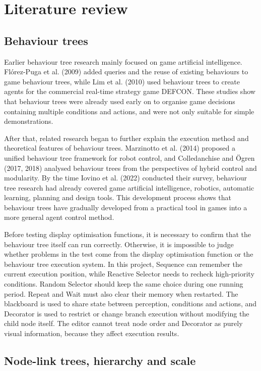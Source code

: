 \chapter{Literature review}

\section{Behaviour trees}

Earlier behaviour tree research mainly focused on game artificial intelligence. Flórez-Puga et al. (2009) added queries and the reuse of existing behaviours to game behaviour trees, while Lim et al. (2010) used behaviour trees to create agents for the commercial real-time strategy game DEFCON. These studies show that behaviour trees were already used early on to organise game decisions containing multiple conditions and actions, and were not only suitable for simple demonstrations.

After that, related research began to further explain the execution method and theoretical features of behaviour trees. Marzinotto et al. (2014) proposed a unified behaviour tree framework for robot control, and Colledanchise and Ögren (2017, 2018) analysed behaviour trees from the perspectives of hybrid control and modularity. By the time Iovino et al. (2022) conducted their survey, behaviour tree research had already covered game artificial intelligence, robotics, automatic learning, planning and design tools. This development process shows that behaviour trees have gradually developed from a practical tool in games into a more general agent control method.

Before testing display optimisation functions, it is necessary to confirm that the behaviour tree itself can run correctly. Otherwise, it is impossible to judge whether problems in the test come from the display optimisation function or the behaviour tree execution system. In this project, Sequence can remember the current execution position, while Reactive Selector needs to recheck high-priority conditions. Random Selector should keep the same choice during one running period. Repeat and Wait must also clear their memory when restarted. The blackboard is used to share state between perception, conditions and actions, and Decorator is used to restrict or change branch execution without modifying the child node itself. The editor cannot treat node order and Decorator as purely visual information, because they affect execution results.

\section{Node-link trees, hierarchy and scale}


